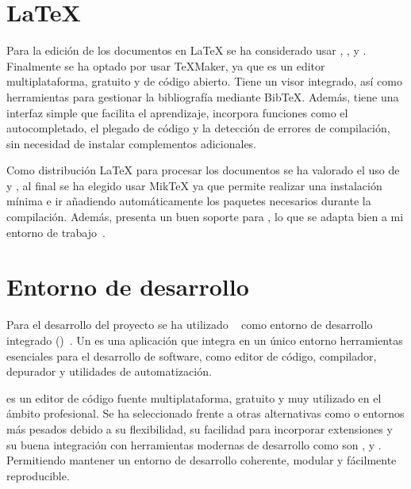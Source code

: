 \section{\LaTeX{}}
Para la edición de los documentos en \LaTeX{} se ha considerado usar , ,  y . Finalmente se ha optado por usar \TeX{Maker}, ya que es un editor multiplataforma, gratuito y de código abierto. Tiene un visor  integrado, así como herramientas para gestionar la bibliografía mediante Bib\TeX{}. Además, tiene una interfaz simple que facilita el aprendizaje, incorpora funciones como el autocompletado, el plegado de código y la detección de errores de compilación, sin necesidad de instalar complementos adicionales.

Como distribución \LaTeX{} para procesar los documentos  se ha valorado el uso de  y , al final se ha elegido usar Mik\TeX{} ya que permite realizar una instalación mínima e ir añadiendo automáticamente los paquetes necesarios durante la compilación. Además, presenta un buen soporte para , lo que se adapta bien a mi entorno de trabajo~\cite{miktex:textlive}.

\section{Entorno de desarrollo}
Para el desarrollo del proyecto se ha utilizado ~\cite{herramienta:vscode} como entorno de desarrollo integrado ()~\cite{herramienta:IDE}. Un  es una aplicación que integra en un único entorno herramientas esenciales para el desarrollo de software, como editor de código, compilador, depurador y utilidades de automatización. 

 es un editor de código fuente multiplataforma, gratuito y muy utilizado en el ámbito profesional. Se ha seleccionado frente a otras alternativas como  o entornos más pesados debido a su flexibilidad, su facilidad para incorporar extensiones y su buena integración con herramientas modernas de desarrollo como son ,  y . Permitiendo mantener un entorno de desarrollo coherente, modular y fácilmente reproducible.

